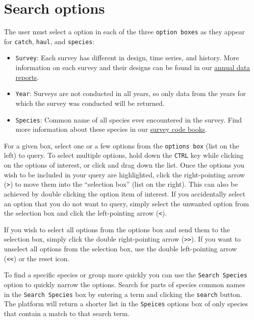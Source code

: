 \documentclass[
  letterpaper,
  oneside,
  open=any]{scrbook}
\providecommand{\tightlist}{%
  \setlength{\itemsep}{0pt}\setlength{\parskip}{0pt}}\usepackage{longtable,booktabs,array}
\begin{document}
\section{Search options}\label{search-options}

The user must select a option in each of the three
\texttt{option\ boxes} as they appear for \texttt{catch}, \texttt{haul},
and \texttt{species}:

\begin{itemize}
\tightlist
\item
  \texttt{Survey}: Each survey has different in design, time series, and
  history. More information on each survey and their designs can be
  found in our
  \href{https://www.fisheries.noaa.gov/alaska/science-data/groundfish-assessment-program-bottom-trawl-surveys\#data-products}{annual
  data reports}.
\item
  \texttt{Year}: Surveys are not conducted in all years, so only data
  from the years for which the survey was conducted will be returned.
\item
  \texttt{Species}: Common name of all species ever encountered in the
  survey. Find more information about these species in our
  \href{https://www.fisheries.noaa.gov/resource/document/groundfish-survey-species-code-manual-and-data-codes-manual}{survey
  code books}.
\end{itemize}

For a given box, select one or a few options from the
\texttt{options\ box} (list on the left) to query. To select multiple
options, hold down the \texttt{CTRL} key while clicking on the options
of interest, or click and drag down the list. Once the options you wish
to be included in your query are highlighted, click the right-pointing
arrow (\texttt{\textgreater{}}) to move them into the ``selection box''
(list on the right). This can also be achieved by double clicking the
option item of interest. If you accidentally select an option that you
do not want to query, simply select the unwanted option from the
selection box and click the left-pointing arrow (\texttt{\textless{}}).

If you wish to select all options from the options box and send them to
the selection box, simply click the double right-pointing arrow
(\texttt{\textgreater{}\textgreater{}}). If you want to unselect all
options from the selection box, use the double left-pointing arrow
(\texttt{\textless{}\textless{}}) or the reset icon.

To find a specific species or group more quickly you can use the
\texttt{Search\ Species} option to quickly narrow the options. Search
for parts of species common names in the \texttt{Search\ Species} box by
entering a term and clicking the \texttt{search} button. The platform
will return a shorter list in the \texttt{Speices} options box of only
species that contain a match to that search term.
\end{document}
